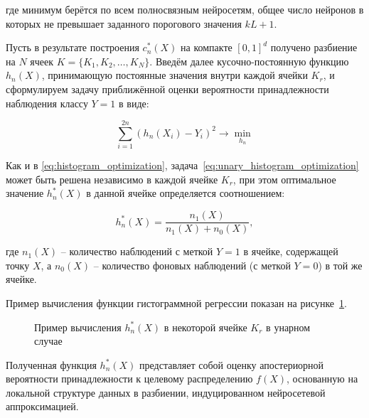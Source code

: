 \noindent где минимум берётся по всем полносвязным нейросетям, общее число нейронов в которых не превышает заданного порогового значения \(kL + 1\).

Пусть в результате построения \(c_n^*(X)\) на компакте \([0, 1]^d\) получено разбиение на \(N\) ячеек \(K = \{K_1, K_2, \dots, K_N\}\). Введём далее кусочно-постоянную функцию \(h_n(X)\), принимающую постоянные значения внутри каждой ячейки \(K_r\), и сформулируем задачу приближённой оценки вероятности принадлежности наблюдения классу \(Y = 1\) в виде:

\begin{equation}
    \label{eq:unary_histogram_optimization}
    \sum_{i=1}^{2n} \left(h_n(X_i) - Y_i\right)^2 \rightarrow \min_{h_n}
\end{equation}

Как и в \cref{eq:histogram_optimization}, задача~\cref{eq:unary_histogram_optimization} может быть решена независимо в каждой ячейке \(K_r\), при этом оптимальное значение \(h_n^*(X)\) в данной ячейке определяется соотношением:

\begin{equation}
    h_n^*(X) = \frac{n_1(X)}{n_1(X) + n_0(X)},
\end{equation}

\noindent где \(n_1(X)\) -- количество наблюдений с меткой \(Y = 1\) в ячейке, содержащей точку \(X\), а \(n_0(X)\) -- количество фоновых наблюдений (с меткой \(Y = 0\)) в той же ячейке.

Пример вычисления функции гистограммной регрессии показан на рисунке~\cref{fig:unary_histogram_evaluation}.

\begin{figure}[ht]
    \caption{Пример вычисления \(h_n^*(X)\) в некоторой ячейке \(K_r\) в унарном случае}
    \label{fig:unary_histogram_evaluation}
\end{figure}

Полученная функция \(h_n^*(X)\) представляет собой оценку апостериорной вероятности принадлежности к целевому распределению \(f(X)\), основанную на локальной структуре данных в разбиении, индуцированном нейросетевой аппроксимацией.